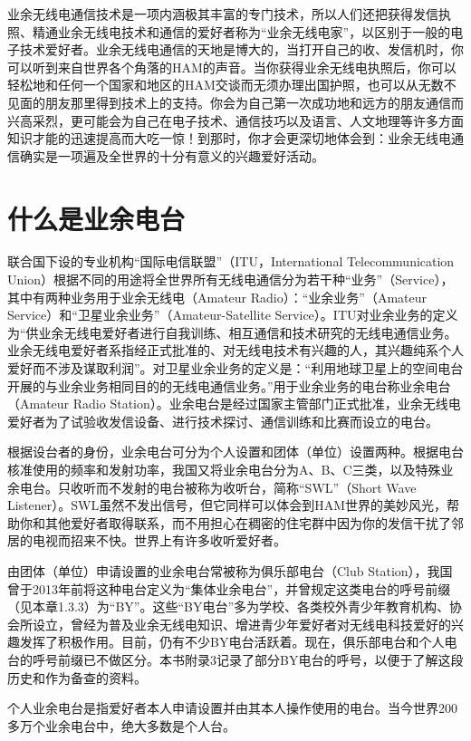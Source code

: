 \documentclass[12pt,UTF8]{ctexbook}
\begin{document}
业余无线电通信技术是一项内涵极其丰富的专门技术，所以人们还把获得发信执照、精通业余无线电技术和通信的爱好者称为“业余无线电家”，以区别于一般的电子技术爱好者。业余无线电通信的天地是博大的，当打开自己的收、发信机时，你可以听到来自世界各个角落的HAM的声音。当你获得业余无线电执照后，你可以轻松地和任何一个国家和地区的HAM交谈而无须办理出国护照，也可以从无数不见面的朋友那里得到技术上的支持。你会为自己第一次成功地和远方的朋友通信而兴高采烈，更可能会为自己在电子技术、通信技巧以及语言、人文地理等许多方面知识才能的迅速提高而大吃一惊！到那时，你才会更深切地体会到：业余无线电通信确实是一项遍及全世界的十分有意义的兴趣爱好活动。

\section{什么是业余电台}

联合国下设的专业机构“国际电信联盟”（ITU，International Telecommunication Union）根据不同的用途将全世界所有无线电通信分为若干种“业务”（Service），其中有两种业务用于业余无线电（Amateur Radio）：“业余业务”（Amateur Service）和“卫星业余业务”（Amateur-Satellite Service）。ITU对业余业务的定义为“供业余无线电爱好者进行自我训练、相互通信和技术研究的无线电通信业务。业余无线电爱好者系指经正式批准的、对无线电技术有兴趣的人，其兴趣纯系个人爱好而不涉及谋取利润”。对卫星业余业务的定义是：“利用地球卫星上的空间电台开展的与业余业务相同目的的无线电通信业务。”用于业余业务的电台称业余电台（Amateur Radio Station）。业余电台是经过国家主管部门正式批准，业余无线电爱好者为了试验收发信设备、进行技术探讨、通信训练和比赛而设立的电台。

根据设台者的身份，业余电台可分为个人设置和团体（单位）设置两种。根据电台核准使用的频率和发射功率，我国又将业余电台分为A、B、C三类，以及特殊业余电台。只收听而不发射的电台被称为收听台，简称“SWL”（Short Wave Listener）。SWL虽然不发出信号，但它同样可以体会到HAM世界的美妙风光，帮助你和其他爱好者取得联系，而不用担心在稠密的住宅群中因为你的发信干扰了邻居的电视而招来不快。世界上有许多收听爱好者。

由团体（单位）申请设置的业余电台常被称为俱乐部电台（Club Station），我国曾于2013年前将这种电台定义为“集体业余电台”，并曾规定这类电台的呼号前缀（见本章1.3.3）为“BY”。这些“BY电台”多为学校、各类校外青少年教育机构、协会所设立，曾经为普及业余无线电知识、增进青少年爱好者对无线电科技爱好的兴趣发挥了积极作用。目前，仍有不少BY电台活跃着。现在，俱乐部电台和个人电台的呼号前缀已不做区分。本书附录3记录了部分BY电台的呼号，以便于了解这段历史和作为备查的资料。

个人业余电台是指爱好者本人申请设置并由其本人操作使用的电台。当今世界200多万个业余电台中，绝大多数是个人台。
\end{document}
